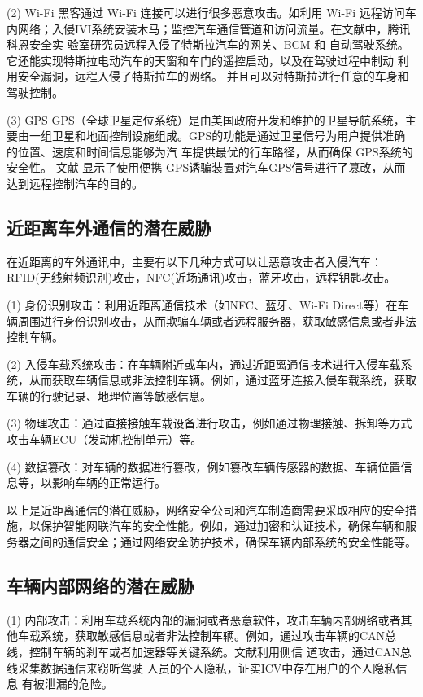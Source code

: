 (2) Wi-Fi
黑客通过 Wi-Fi 连接可以进行很多恶意攻击。如利用 Wi-Fi 远程访问车内网络；入侵IVI系统安装木马；监控汽车通信管道和访问流量。在文献\cite{keen}中，腾讯科恩安全实
验室研究员远程入侵了特斯拉汽车的网关、BCM 和
自动驾驶系统。它还能实现特斯拉电动汽车的天窗和车门的遥控启动，以及在驾驶过程中制动
利用安全漏洞，远程入侵了特斯拉车的网络。
并且可以对特斯拉进行任意的车身和驾驶控制。

(3) GPS
GPS（全球卫星定位系统）是由美国政府开发和维护的卫星导航系统，主要由一组卫星和地面控制设施组成。GPS的功能是通过卫星信号为用户提供准确的位置、速度和时间信息能够为汽
车提供最优的行车路径，从而确保 GPS系统的安全性。
文献\cite{cuigai}
显示了使用便携 GPS诱骗装置对汽车GPS信号进行了篡改，从而达到远程控制汽车的目的。

\subsection{近距离车外通信的潜在威胁}
在近距离的车外通讯中，主要有以下几种方式可以让恶意攻击者入侵汽车：RFID(无线射频识别)攻击，NFC(近场通讯)攻击，蓝牙攻击，远程钥匙攻击。

(1) 身份识别攻击：利用近距离通信技术（如NFC、蓝牙、Wi-Fi Direct等）在车辆周围进行身份识别攻击，从而欺骗车辆或者远程服务器，获取敏感信息或者非法控制车辆。

(2) 入侵车载系统攻击：在车辆附近或车内，通过近距离通信技术进行入侵车载系统，从而获取车辆信息或非法控制车辆。例如，通过蓝牙连接入侵车载系统，获取车辆的行驶记录、地理位置等敏感信息。

(3) 物理攻击：通过直接接触车载设备进行攻击，例如通过物理接触、拆卸等方式攻击车辆ECU（发动机控制单元）等。

(4) 数据篡改：对车辆的数据进行篡改，例如篡改车辆传感器的数据、车辆位置信息等，以影响车辆的正常运行。

以上是近距离通信的潜在威胁，网络安全公司和汽车制造商需要采取相应的安全措施，以保护智能网联汽车的安全性能。例如，通过加密和认证技术，确保车辆和服务器之间的通信安全；通过网络安全防护技术，确保车辆内部系统的安全性能等。

\subsection{车辆内部网络的潜在威胁}
(1) 内部攻击：利用车载系统内部的漏洞或者恶意软件，攻击车辆内部网络或者其他车载系统，获取敏感信息或者非法控制车辆。例如，通过攻击车辆的CAN总线，控制车辆的刹车或者加速器等关键系统。文献\cite{koscher2010experimental}利用侧信
道攻击，通过CAN总线采集数据通信来窃听驾驶
人员的个人隐私，证实ICV中存在用户的个人隐私信息
有被泄漏的危险。

